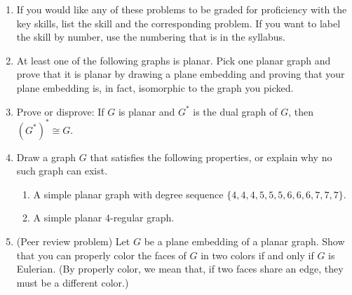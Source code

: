 \documentclass[12pt]{article}
\begin{document}
\begin{enumerate}
\item[0.] If you would like any of these problems to be graded for proficiency with the key skills, list the skill and the corresponding problem.  If you want to label the skill by number, use the numbering that is in the syllabus.

\item At least one of the following graphs is planar.   Pick one planar graph and prove that it is planar by drawing a plane embedding and proving that your plane embedding is, in fact, isomorphic to the graph you picked.  
\begin{center}
\end{center}



\item Prove or disprove: If $G$ is planar and $G^*$ is the dual graph of $G$, then $(G^*)^*\cong G$. 
\item Draw a graph $G$ that satisfies the following properties, or explain why no such graph can exist.
\begin{enumerate}
\item A simple planar graph with degree sequence $\{4,4,4,5,5,5,6,6,6,7,7,7\}$.
\item A simple planar 4-regular graph.
\end{enumerate}

   
   \item (Peer review problem) Let $G$ be a plane embedding of a planar graph. Show that you can properly color the faces of $G$ in two colors if and only if $G$ is Eulerian.  (By properly color, we mean that, if two faces share an edge, they must be a different color.)
   

\end{enumerate}
\end{document}
